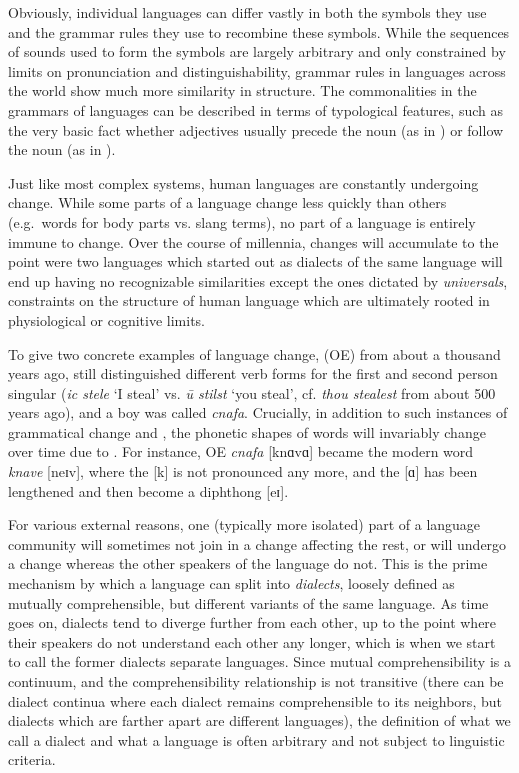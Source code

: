 \newpage 
Obviously, individual languages can differ vastly in both the symbols they use and the grammar rules they use to recombine these symbols. While the sequences of sounds used to form the symbols are largely arbitrary and only constrained by limits on pronunciation and distinguishability, grammar rules in languages across the world show much more similarity in structure. The commonalities in the grammars of languages can be described in terms of typological features, such as the very basic fact whether adjectives usually precede the noun (as in ) or follow the noun (as in ).

Just like most complex systems, human languages are constantly undergoing change. While some parts of a language change less quickly than others (e.g.\ words for body parts vs. slang terms), no part of a language is entirely immune to change. Over the course of millennia, changes will accumulate to the point were two languages which started out as dialects of the same language will end up having no recognizable similarities except the ones dictated by \textit{universals}, constraints on the structure of human language which are ultimately rooted in physiological or cognitive limits.

To give two concrete examples of language change,  (OE) from about a thousand years ago, still distinguished different verb forms for the first and second person singular (\textit{ic stele} `I steal' vs. \textit{\th{}\={u} stilst} `you steal', cf. \textit{thou stealest} from about 500 years ago), and a boy was called \textit{cnafa}. Crucially, in addition to such instances of grammatical change and , the phonetic shapes of words will invariably change over time due to . For instance, OE \textit{cnafa} {[knɑvɑ]} became the modern word \textit{knave} [neɪv], where the [k] is not pronounced any more, and the [ɑ] has been lengthened and then become a diphthong [eɪ].

For various external reasons, one (typically more isolated) part of a language community will sometimes not join in a change affecting the rest, or will undergo a change whereas the other speakers of the language do not. This is the prime mechanism by which a language can split into \textit{dialects}, loosely defined as mutually comprehensible, but different variants of the same language. As time goes on, dialects tend to diverge further from each other, up to the point where their speakers do not understand each other any longer, which is when we start to call the former dialects separate languages. Since mutual comprehensibility is a continuum, and the comprehensibility relationship is not transitive (there can be dialect continua where each dialect remains comprehensible to its neighbors, but dialects which are farther apart are different languages), the definition of what we call a dialect and what a language is often arbitrary and not subject to linguistic criteria.


